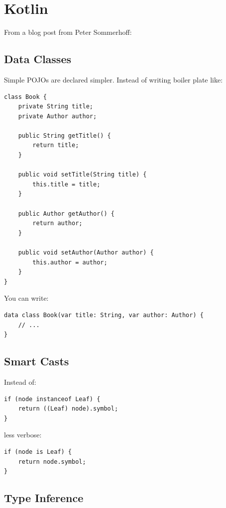 \documentclass[12pt,a4paper]{report}
\begin{document}
\section{Kotlin}

From a blog post from Peter Sommerhoff\cite{kotlin-sommerhoff}:

\subsection{Data Classes}

Simple POJOs are declared simpler. Instead of writing boiler plate like:

\begin{verbatim}
class Book {
    private String title;
    private Author author;

    public String getTitle() {
        return title;
    }
    
    public void setTitle(String title) {
        this.title = title;
    }

    public Author getAuthor() {
        return author;
    }
    
    public void setAuthor(Author author) {
        this.author = author;
    }
}
\end{verbatim}

You can write:

\begin{verbatim}
data class Book(var title: String, var author: Author) {
    // ...
}	
\end{verbatim}

\subsection{Smart Casts}

Instead of:

\begin{verbatim}
if (node instanceof Leaf) {
    return ((Leaf) node).symbol;
}	
\end{verbatim}

less verbose:

\begin{verbatim}
if (node is Leaf) {
    return node.symbol;
}	
\end{verbatim}

\subsection{Type Inference}
\end{document}
